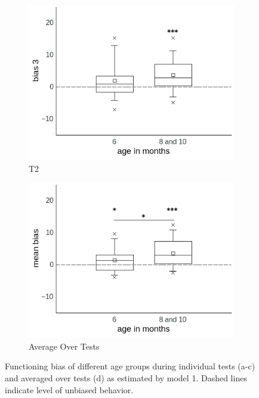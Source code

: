 \documentclass[a4paper]{scrreprt}
\begin{document}
\begin{figure}
    \begin{subfigure}[b]{0.49\textwidth}
        \includegraphics[width=\textwidth]{figs/sec3/age/age2_diff3_mod1.jpeg}
        \caption{T2}
    \end{subfigure}
    \begin{subfigure}[b]{0.49\textwidth}
        \includegraphics[width=\textwidth]{figs/sec3/age/age2_diff_mean_mod1.jpeg}
        \caption{Average Over Tests}
    \end{subfigure}
\caption{Functioning bias of different age groups during individual tests (a-c) and averaged over tests (d) as estimated by model 1. Dashed lines indicate level of unbiased behavior.}
\label{fig:age2_diff_mod1}
\end{figure}
\end{document}
